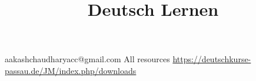 \documentclass[a4paper]{article}
\title{Deutsch Lernen}
\begin{document}
    \maketitle
    aakashchaudharyacc@gmail.com
    All resources
    \url{https://deutschkurse-passau.de/JM/index.php/downloads}
\end{document}
